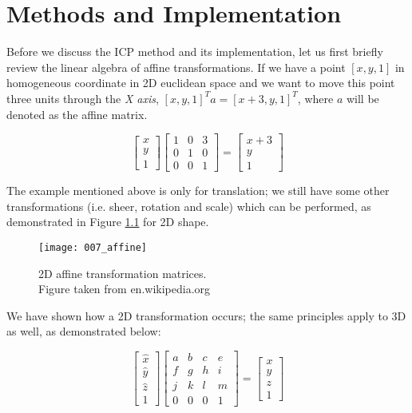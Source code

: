 \documentclass[../structure.tex]{subfiles}
\begin{document}
\chapter{Methods and Implementation}
\hspace{2em}Before we discuss the ICP method and its implementation, let us first briefly review the linear algebra of affine transformations. If we have a point $[x,y,1]$ in homogeneous coordinate in 2D euclidean space and we want to move this point three units through the \textit{X axis}, $[x,y,1]^T a = [x+3,y,1]^T$, where $a$ will be  denoted as the affine matrix.

\begin{equation*}
\begin{bmatrix}
x \\ y \\ 1
\end{bmatrix}
\begin{bmatrix}
1 & 0 & 3 \\
0 & 1 & 0 \\
0 & 0 & 1
\end{bmatrix}
=
\begin{bmatrix}
x + 3 \\ y \\ 1
\end{bmatrix}
\end{equation*}

The example mentioned above is only for translation; we still have some other transformations (i.e. sheer, rotation and scale) which can be performed, as demonstrated in Figure \ref{fig:affine} for 2D shape.

\begin{figure}[h!]
\centering
\texttt{[image: 007\_affine]}
\captionsetup{justification=centering}
\caption{2D affine transformation matrices.\\ Figure taken from en.wikipedia.org}
\label{fig:affine}
\end{figure}

We have shown how a 2D transformation occurs; the same principles apply to 3D as well, as demonstrated below:

\begin{equation*}
\begin{bmatrix}
\hat{x} \\ \hat{y} \\ \hat{z} \\ 1
\end{bmatrix}
\begin{bmatrix}
a & b & c & e\\
f & g & h & i\\
j & k & l & m\\
0 & 0 & 0 & 1
\end{bmatrix}
=
\begin{bmatrix}
x \\ y \\ z \\ 1
\end{bmatrix}
\end{equation*}
\end{document}

